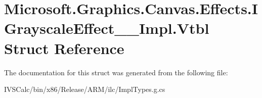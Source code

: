 \hypertarget{struct_microsoft_1_1_graphics_1_1_canvas_1_1_effects_1_1_i_grayscale_effect_____impl_1_1_vtbl}{}\section{Microsoft.\+Graphics.\+Canvas.\+Effects.\+I\+Grayscale\+Effect\+\_\+\+\_\+\+Impl.\+Vtbl Struct Reference}
\label{struct_microsoft_1_1_graphics_1_1_canvas_1_1_effects_1_1_i_grayscale_effect_____impl_1_1_vtbl}


The documentation for this struct was generated from the following file\+:\begin{DoxyCompactItemize}
\item 
I\+V\+S\+Calc/bin/x86/\+Release/\+A\+R\+M/ilc/Impl\+Types.\+g.\+cs\end{DoxyCompactItemize}
